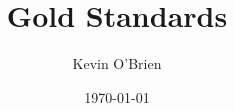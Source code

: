 \documentclass[12pt, a4paper]{article}
\begin{document}
	\author{Kevin O'Brien}
	\title{Gold Standards}
	\date{\today}
	\maketitle
	\tableofcontents



\end{document}
